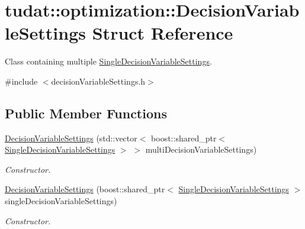 \hypertarget{structtudat_1_1optimization_1_1DecisionVariableSettings}{}\section{tudat\+:\+:optimization\+:\+:Decision\+Variable\+Settings Struct Reference}
\label{structtudat_1_1optimization_1_1DecisionVariableSettings}


Class containing multiple \hyperlink{structtudat_1_1optimization_1_1SingleDecisionVariableSettings}{Single\+Decision\+Variable\+Settings}.  




{\ttfamily \#include $<$decision\+Variable\+Settings.\+h$>$}

\subsection*{Public Member Functions}
\begin{DoxyCompactItemize}
\item 
\hyperlink{structtudat_1_1optimization_1_1DecisionVariableSettings_a669618bf6c2882c328f54cb8c485523d}{Decision\+Variable\+Settings} (std\+::vector$<$ boost\+::shared\+\_\+ptr$<$ \hyperlink{structtudat_1_1optimization_1_1SingleDecisionVariableSettings}{Single\+Decision\+Variable\+Settings} $>$ $>$ multi\+Decision\+Variable\+Settings)
\begin{DoxyCompactList}\small\item\em Constructor. \end{DoxyCompactList}\item 
\hyperlink{structtudat_1_1optimization_1_1DecisionVariableSettings_a19ef102eb509b0261686e022824e20d5}{Decision\+Variable\+Settings} (boost\+::shared\+\_\+ptr$<$ \hyperlink{structtudat_1_1optimization_1_1SingleDecisionVariableSettings}{Single\+Decision\+Variable\+Settings} $>$ single\+Decision\+Variable\+Settings)
\begin{DoxyCompactList}\small\item\em Constructor. \end{DoxyCompactList}\end{DoxyCompactItemize}
